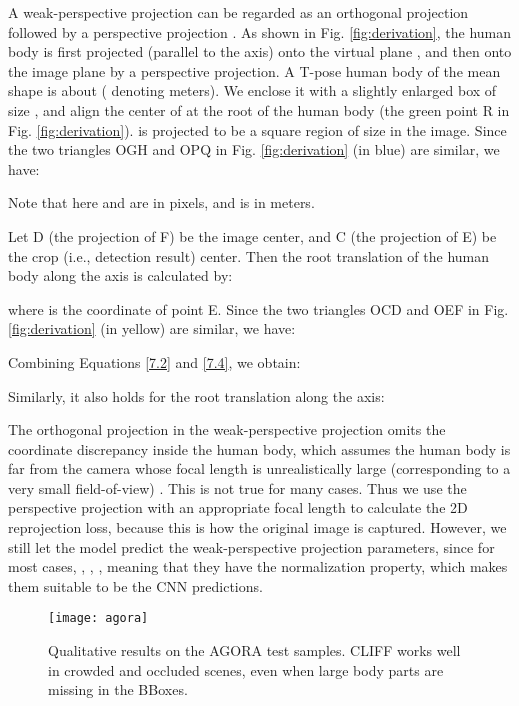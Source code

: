 \documentclass[runningheads]{llncs}
\begin{document}
A weak-perspective projection can be regarded as an orthogonal projection followed by a perspective projection \cite{shimshoni1999geometric}.
As shown in Fig. \ref{fig:derivation}, the human body is first projected (parallel to the  axis) onto the virtual plane , and then onto the image plane  by a perspective projection.
A T-pose human body of the mean shape is about  ( denoting meters).
We enclose it with a slightly enlarged box  of size , and align the center of  at the root of the human body (the green point R in Fig. \ref{fig:derivation}).
 is projected to be a square region of size  in the image.
Since the two triangles OGH and OPQ in Fig. \ref{fig:derivation} (in blue) are similar, we have:

Note that here  and  are in pixels, and  is in meters.

Let D (the projection of F) be the image center, and C (the projection of E) be the crop (i.e., detection result) center.
Then the root translation of the human body along the  axis is calculated by:

where  is the  coordinate of point E.
Since the two triangles OCD and OEF in Fig. \ref{fig:derivation} (in yellow) are similar, we have:

Combining Equations \ref{7.2} and \ref{7.4}, we obtain:

Similarly, it also holds for the root translation along the  axis:


The orthogonal projection in the weak-perspective projection omits the  coordinate discrepancy inside the human body, which assumes the human body is far from the camera whose focal length is unrealistically large (corresponding to a very small field-of-view) \cite{kanazawa2018end,kolotouros2019learning}.
This is not true for many cases.
Thus we use the perspective projection with an appropriate focal length to calculate the 2D reprojection loss, because this is how the original image is captured.
However, we still let the model predict the weak-perspective projection parameters, since for most cases, , , , meaning that they have the normalization property, which makes them suitable to be the CNN predictions.



\begin{figure}[t]
	\centering
	\texttt{[image: agora]}
	\caption {Qualitative results on the AGORA test samples. CLIFF works well in crowded and occluded scenes, even when large body parts are missing in the BBoxes.}
	\label{fig:agora}
\end{figure}
\end{document}
